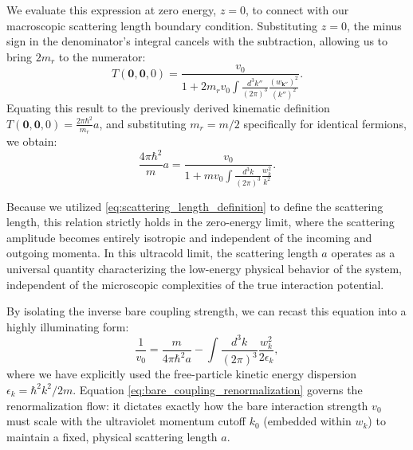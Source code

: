 We evaluate this expression at zero energy, \( z = 0 \), to connect with our macroscopic scattering length boundary condition. Substituting \( z = 0 \), the minus sign in the denominator's integral cancels with the subtraction, allowing us to bring \( 2m_r \) to the numerator:
\[
    T(\mathbf{0}, \mathbf{0}, 0) = \frac{v_0}{1 + 2m_r v_0 \int \frac{d^3 k''}{(2\pi)^3} \frac{(w_{\mathbf{k}''})^2}{(k'')^2}}.
\]
Equating this result to the previously derived kinematic definition \( T(\mathbf{0}, \mathbf{0}, 0) = \frac{2\pi\hbar^2}{m_r} a \), and substituting \( m_r = m/2 \) specifically for identical fermions, we obtain:
\[
    \frac{4\pi\hbar^2}{m} a = \frac{v_0}{1 + m v_0 \int \frac{d^3 k}{(2\pi)^3} \frac{w_k^2}{k^2}}.
\]

\begin{remark}
    Because we utilized \eqref{eq:scattering_length_definition} to define the scattering length, this relation strictly holds in the zero-energy limit, where the scattering amplitude becomes entirely isotropic and independent of the incoming and outgoing momenta. In this ultracold limit, the scattering length \( a \) operates as a universal quantity characterizing the low-energy physical behavior of the system, independent of the microscopic complexities of the true interaction potential.
\end{remark}

By isolating the inverse bare coupling strength, we can recast this equation into a highly illuminating form:
\begin{equation} \label{eq:bare_coupling_renormalization}
    \frac{1}{v_0} = \frac{m}{4\pi\hbar^2 a} - \int \frac{d^3 k}{(2\pi)^3} \frac{w_k^2}{2\epsilon_k},
\end{equation}
where we have explicitly used the free-particle kinetic energy dispersion \( \epsilon_k = \hbar^2 k^2 / 2m \). Equation \eqref{eq:bare_coupling_renormalization} governs the renormalization flow: it dictates exactly how the bare interaction strength \( v_0 \) must scale with the ultraviolet momentum cutoff \( k_0 \) (embedded within \( w_k \)) to maintain a fixed, physical scattering length \( a \).

